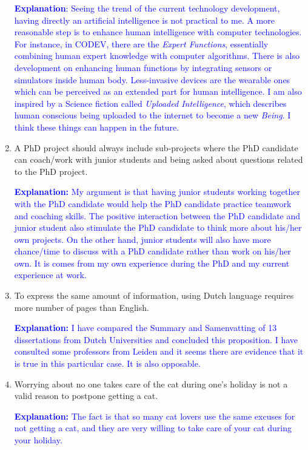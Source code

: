 \documentclass{dissertation}
\begin{document}
\begin{enumerate}
\textcolor{blue}{\textbf{Explanation}: Seeing the trend of the current technology development, having directly an artificial intelligence is not practical to me. A more reasonable step is to enhance human intelligence with computer technologies. For instance, in CODEV, there are the \textit{Expert Functions}, essentially combining human expert knowledge with computer algorithms. There is also development on enhancing human functions by integrating sensors or simulators inside human body. Less-invasive devices are the wearable ones which can be perceived as an extended part for human intelligence. I am also inspired by a Science fiction called \textit{Uploaded Intelligence}, which describes human conscious being uploaded to the internet to become a new \textit{Being}. I think these things can happen in the future. } 

\item A PhD project should always include sub-projects where the PhD candidate can coach/work with junior students and being asked about questions related to the PhD project. 

\textcolor{blue}{\textbf{Explanation:} My argument is that having junior students working together with the PhD candidate would help the PhD candidate practice teamwork and coaching skills. The positive interaction between the PhD candidate and junior student also stimulate the PhD candidate to think more about his/her own projects. On the other hand, junior students will also have more chance/time to discuss with a PhD candidate rather than work on his/her own. It is comes from my own experience during the PhD and my current experience at work.}

\item To express the same amount of information, using Dutch language requires more number of pages than English. 

\textcolor{blue}{\textbf{Explanation:} I have compared the Summary and Samenvatting of 13 dissertations from Dutch Universities and concluded this proposition. I have consulted some professors from Leiden and it seems there are evidence that it is true in this particular case. It is also opposable.}

\item Worrying about no one takes care of the cat during one's holiday is not a valid reason to postpone getting a cat. 

\textcolor{blue}{\textbf{Explanation:} The fact is that so many cat lovers use the same excuses for not getting a cat, and they are very willing to take care of your cat during your holiday. 
}


\end{enumerate}
\end{document}
